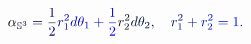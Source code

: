 \documentclass[12pt]{article}
\begin{document}
\makeatletter
\renewcommand*{\@textcolor}[3]{%
  \protect\leavevmode
  \begingroup
    \color#1{#2}#3%
  \endgroup
}
\makeatother
\begin{displaymath}
\mathcolor[RGB]{0,0,15}{\alpha} _ { \mathbb { \mathcolor[RGB]{0,0,30}{S} } ^ { \mathcolor[RGB]{0,0,45}{3} } } \mathcolor[RGB]{0,0,60}{=} \mathcolor[RGB]{0,0,75}{\frac { \mathcolor[RGB]{0,0,90}{1} } { \mathcolor[RGB]{0,0,105}{2} } } \mathcolor[RGB]{0,0,120}{r} _ { \mathcolor[RGB]{0,0,135}{1} } ^ { \mathcolor[RGB]{0,0,150}{2} } \mathcolor[RGB]{0,0,165}{d} \mathcolor[RGB]{0,0,180}{\theta} _ { \mathcolor[RGB]{0,0,195}{1} } \mathcolor[RGB]{0,0,210}{+} \mathcolor[RGB]{0,0,225}{\frac { \mathcolor[RGB]{0,0,240}{1} } { \mathcolor[RGB]{0,0,255}{2} } } \mathcolor[RGB]{0,15,0}{r} _ { \mathcolor[RGB]{0,15,15}{2} } ^ { \mathcolor[RGB]{0,15,30}{2} } \mathcolor[RGB]{0,15,45}{d} \mathcolor[RGB]{0,15,60}{\theta} _ { \mathcolor[RGB]{0,15,75}{2} } \mathcolor[RGB]{0,15,90}{,} \quad \mathcolor[RGB]{0,15,105}{r} _ { \mathcolor[RGB]{0,15,120}{1} } ^ { \mathcolor[RGB]{0,15,135}{2} } \mathcolor[RGB]{0,15,150}{+} \mathcolor[RGB]{0,15,165}{r} _ { \mathcolor[RGB]{0,15,180}{2} } ^ { \mathcolor[RGB]{0,15,195}{2} } \mathcolor[RGB]{0,15,210}{=} \mathcolor[RGB]{0,15,225}{1} \mathcolor[RGB]{0,15,240}{.}
\end{displaymath}
\end{document}
